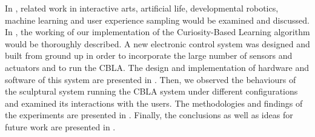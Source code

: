 In , related work in interactive arts, artificial life, developmental robotics, machine learning and user experience sampling would be examined and discussed. In , the working of our implementation of the Curiosity-Based Learning algorithm would be thoroughly described. A new electronic control system was designed and built from ground up in order to incorporate the large number of sensors and actuators and to run the CBLA. The design and implementation of hardware and software of this system are presented in . Then, we observed the behaviours of the sculptural system running the CBLA system under different configurations and examined its interactions with the users. The methodologies and findings of the experiments are presented in . Finally, the conclusions as well as ideas for future work are presented in .
